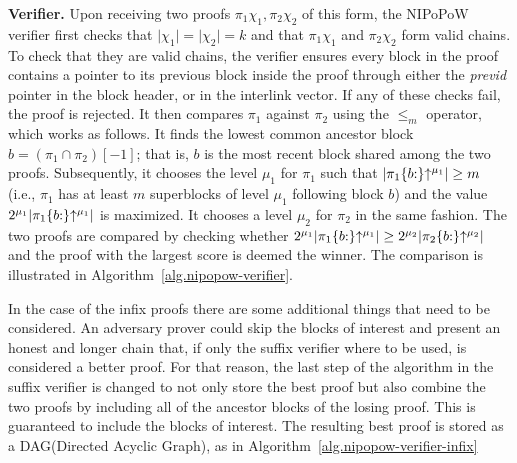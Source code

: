 \noindent \textbf{Verifier.} Upon receiving two proofs $\pi_1\chi_1,
\pi_2\chi_2$ of this form, the NIPoPoW verifier first checks that $\lvert
\chi_1 \rvert = \lvert \chi_2 \rvert = k$ and that $\pi_1 \chi_1$ and $\pi_2
\chi_2$ form valid chains. To check that they are valid chains, the verifier
ensures every block in the proof contains a pointer to its previous block
inside the proof through either the \emph{previd} pointer in the block header,
or in the interlink vector. If any of these checks fail, the proof is rejected.
It then compares $\pi_1$ against $\pi_2$ using the $\leq_m$ operator, which
works as follows. It finds the lowest common ancestor block $b = (\pi_1 \cap
\pi_2)[-1]$; that is, $b$ is the most recent block shared among the two proofs.
Subsequently, it chooses the level $\mu_1$ for $\pi_1$ such that $\lvert
\pi_1\{b{:}\}\negthickspace\uparrow^{\mu_1} \rvert \geq m$ (i.e., $\pi_1$ has at least $m$
superblocks of level $\mu_1$ following block $b$) and the value $2^{\mu_1}
\lvert \pi_1\{b{:}\}\negthickspace\uparrow^{\mu_1} \rvert$ is maximized.  It chooses a level
$\mu_2$ for $\pi_2$ in the same fashion. The two proofs are compared by
checking whether $2^{\mu_1} \lvert \pi_1\{b{:}\}\negthickspace\uparrow^{\mu_1} \rvert \geq
2^{\mu_2} \lvert \pi_2\{b{:}\}\negthickspace\uparrow^{\mu_2} \rvert$ and the proof with the
largest score is deemed the winner. The comparison is illustrated in
Algorithm~\ref{alg.nipopow-verifier}.



In the case of the infix proofs there are some additional things that need to
be considered. An adversary prover could skip the blocks of interest and
present an honest and longer chain that, if only the suffix verifier where to
be used, is considered a better proof. For that reason, the last step of the
algorithm in the suffix verifier is changed to not only store the best proof
but also combine the two proofs by including all of the ancestor blocks of the
losing proof. This is guaranteed to include the blocks of interest. The
resulting best proof is stored as a DAG(Directed Acyclic Graph), as in
Algorithm~\ref{alg.nipopow-verifier-infix}



